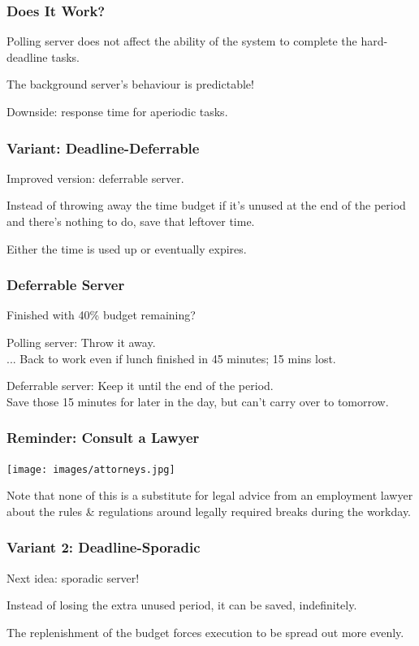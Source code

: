 \begin{frame}
\frametitle{Does It Work?}
Polling server does not affect the ability of the system to complete the hard-deadline tasks.

The background server's behaviour is predictable!

Downside: response time for aperiodic tasks.

\end{frame}

\begin{frame}
\frametitle{Variant: Deadline-Deferrable}

Improved version: deferrable server.

Instead of throwing away the time budget if it's unused at the end of the period and there's nothing to do, save that leftover time.

Either the time is used up or eventually expires.

\end{frame}

\begin{frame}
\frametitle{Deferrable Server}
Finished with 40\% budget remaining?

Polling server: Throw it away.\\
\quad... Back to work even if lunch finished in 45 minutes; 15 mins lost.

Deferrable server: Keep it until the end of the period.\\
\quad Save those 15 minutes for later in the day, but can't carry over to tomorrow.

\end{frame}

\begin{frame}
\frametitle{Reminder: Consult a Lawyer}

\begin{center}
	\texttt{[image: images/attorneys.jpg]}
\end{center}

Note that none of this is a substitute for legal advice from an employment lawyer about the rules \& regulations around legally required breaks during the workday.

\end{frame}

\begin{frame}
\frametitle{Variant 2: Deadline-Sporadic}

Next idea: sporadic server!


Instead of losing the extra unused period, it can be saved, indefinitely. 

The replenishment of the budget forces execution to be spread out more evenly.

\end{frame}


